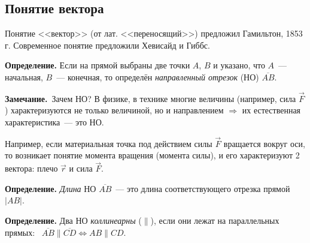 \documentclass[a4paper,11pt]{article}
\newcommand{\zam}{\textbf{Замечание.}\ }
\begin{document}
\subsection{Понятие вектора}
Понятие <<вектор>> (от лат. <<переносящий>>) предложил Гамильтон, 1853\,г. Современное понятие
предложили Хевисайд и Гиббс.

\begin{opr}
\textbf{Определение.} Если на прямой выбраны две точки $A$, $B$ и указано, что $A$~--- начальная, $B$~---
конечная, то определён \emph{направленный отрезок} (НО) $\overline{AB}$.
\end{opr}
\begin{center}
\end{center}

\zam Зачем НО? В физике, в технике многие величины (например, сила $\vec F$) характеризуются не только
величиной, но и направлением $\Rightarrow$ их естественная характеристика~--- это НО.

\begin{minipage}[c]{0.6\linewidth}
Например, если материальная точка под действием силы $\vec F$ вращается вокруг оси, то возникает
понятие момента вращения (момента силы), и его характеризуют 2 вектора: плечо $\vec r$ и сила $\vec F$.
\end{minipage}\hfill
\begin{minipage}[c]{0.36\linewidth}
\centering
{}
\end{minipage}

\begin{opr}
\textbf{Определение.} \emph{Длина} НО $\overline{AB}$~--- это длина соответствующего отрезка прямой $|AB|$.
\end{opr}
\begin{opr}
\textbf{Определение.} Два НО \emph{коллинеарны} ($\parallel$), если они лежат на параллельных прямых:
\ $\overline{AB}\parallel\overline{CD}\iff AB\parallel CD$.
\end{opr}
\end{document}
